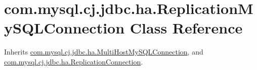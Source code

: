 \hypertarget{classcom_1_1mysql_1_1cj_1_1jdbc_1_1ha_1_1_replication_my_s_q_l_connection}{}\section{com.\+mysql.\+cj.\+jdbc.\+ha.\+Replication\+My\+S\+Q\+L\+Connection Class Reference}
\label{classcom_1_1mysql_1_1cj_1_1jdbc_1_1ha_1_1_replication_my_s_q_l_connection}


Inherits \mbox{\hyperlink{classcom_1_1mysql_1_1cj_1_1jdbc_1_1ha_1_1_multi_host_my_s_q_l_connection}{com.\+mysql.\+cj.\+jdbc.\+ha.\+Multi\+Host\+My\+S\+Q\+L\+Connection}}, and \mbox{\hyperlink{interfacecom_1_1mysql_1_1cj_1_1jdbc_1_1ha_1_1_replication_connection}{com.\+mysql.\+cj.\+jdbc.\+ha.\+Replication\+Connection}}.

